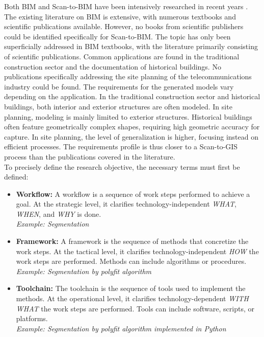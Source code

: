 \begin{English}
    Both BIM and Scan-to-BIM have been intensively researched in recent years \cite{rochaSurveyScantoBIMPractices2021}. \\
    The existing literature on BIM is extensive, with numerous textbooks and scientific publications available. However, no books from scientific publishers could be identified specifically for Scan-to-BIM. The topic has only been superficially addressed in BIM textbooks, with the literature primarily consisting of scientific publications. Common applications are found in the traditional construction sector and the documentation of historical buildings. No publications specifically addressing the site planning of the telecommunications industry could be found. The requirements for the generated models vary depending on the application. In the traditional construction sector and historical buildings, both interior and exterior structures are often modeled. In site planning, modeling is mainly limited to exterior structures. Historical buildings often feature geometrically complex shapes, requiring high geometric accuracy for capture. In site planning, the level of generalization is higher, focusing instead on efficient processes. The requirements profile is thus closer to a Scan-to-GIS process than the publications covered in the literature. \\

    To precisely define the research objective, the necessary terms must first be defined:

    \begin{itemize}
        \item \textbf{Workflow:} A workflow is a sequence of work steps performed to achieve a goal. At the strategic level, it clarifies technology-independent \textit{WHAT}, \textit{WHEN}, and \textit{WHY} is done.\\
        \textit{Example: Segmentation}

        \item \textbf{Framework:} A framework is the sequence of methods that concretize the work steps. At the tactical level, it clarifies technology-independent \textit{HOW} the work steps are performed. Methods can include algorithms or procedures.\\
        \textit{Example: Segmentation by polyfit algorithm}

        \item \textbf{Toolchain:} The toolchain is the sequence of tools used to implement the methods. At the operational level, it clarifies technology-dependent \textit{WITH WHAT} the work steps are performed. Tools can include software, scripts, or platforms.\\
        \textit{Example: Segmentation by polyfit algorithm implemented in Python}
    \end{itemize}


\end{English}
